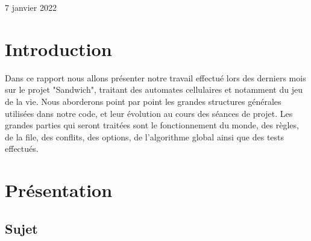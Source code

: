 \documentclass[11pt, a4paper]{article}
\begin{document}
    \vfill

\begin{center}
    {\large 7 janvier 2022}
\end{center}
\newpage
\begin{center}
\tableofcontents
\end{center}
\newpage
\pagestyle{fancy}
\fancyheadoffset{1cm}
\setlength{\headheight}{2cm}
\rhead{\nouppercase{\leftmark}}
\rfoot{\thepage}
\lfoot{}

\section{Introduction}

Dans ce rapport nous allons présenter notre travail effectué lors des derniers mois sur le projet "Sandwich", traitant des automates cellulaires et notamment du jeu de la vie. Nous aborderons point par point les grandes structures générales utilisées dans notre code, et leur évolution au cours des séances de projet. Les grandes parties qui seront traitées sont le fonctionnement du monde, des règles, de la file, des conflits, des options, de l'algorithme global ainsi que des tests effectués. 
\section{Présentation}

\subsection{Sujet}
\end{document}
